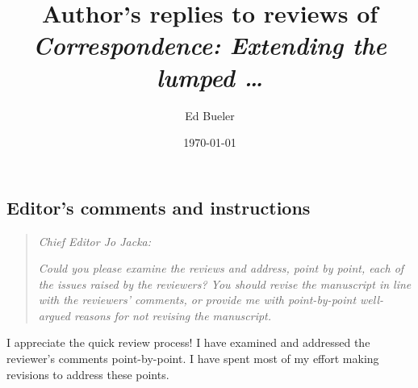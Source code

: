 \documentclass[11pt,reqno]{amsart}
\title[Author's replies to reviews of \emph{Correspondence: Extending \dots}]{Author's replies to reviews of \\ \emph{Correspondence: Extending the lumped \dots}}
\author{Ed Bueler}
\date{\today}
\begin{document}
\maketitle

\thispagestyle{empty}



\subsection*{Editor's comments and instructions}  \begin{quote}
\emph{Chief Editor Jo Jacka:}

\emph{Could you please examine the reviews and address, point by point, each of the issues raised by the reviewers? You should revise the manuscript in line with the reviewers' comments, or provide me with point-by-point well-argued reasons for not revising the manuscript.}
\end{quote}

\medskip
\noindent I appreciate the quick review process!  I have examined and addressed the reviewer's comments point-by-point.  I have spent most of my effort making revisions to address these points.
\end{document}
